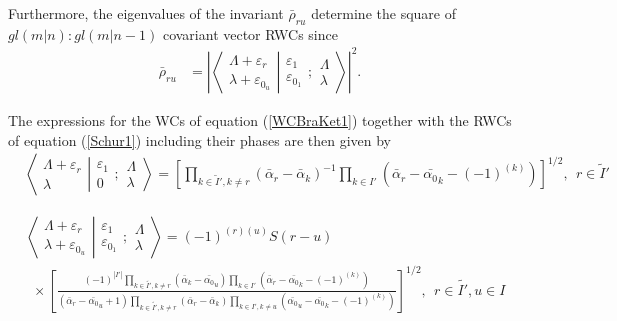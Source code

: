 \documentclass[12pt]{article}
\def\nn{\nonumber}
\begin{document}
Furthermore, the eigenvalues of the invariant $\bar{\rho}_{ru}$ determine the square of $gl(m|n):gl(m|n-1)$ covariant vector RWCs \cite{GIW2} since 
\begin{align}
\bar{\rho}_{ru}  &= \left| \left\langle\left. 
\begin{array}{c} \Lambda+\varepsilon_r\\ \lambda+\varepsilon_{0_u} \end{array}
\right|\right.
\left.
\begin{array}{c} \varepsilon_1 \\
\varepsilon_{0_1} \end{array} 
;
 \begin{array}{c} \Lambda \\
\lambda \end{array}
\right\rangle \right|^2.
\end{align}

The expressions for the WCs of equation (\ref{WCBraKet1}) together with the RWCs of equation (\ref{Schur1}) including their phases \cite{GIW2} are then given by
\begin{align}
& \left\langle\left. 
\begin{array}{c} \Lambda+\varepsilon_r\\ \lambda
 \end{array}
\right|\right.
\left.
\begin{array}{c} \varepsilon_1 \\ 0 
 \end{array}
; \begin{array}{c} \Lambda \\ \lambda
 \end{array}
\right\rangle = \left[ \prod_{k\in \tilde{I}',k\neq r} \left(\bar{\alpha}_r - \bar{\alpha}_k\right)^{-1}\prod_{k\in
I'} \left(\bar{\alpha}_r - \bar{\alpha_0}_k - (-1)^{(k)}\right) \right]^{1/2}
,\ \ r\in \tilde{I}'
\end{align}

\begin{align}
& \left\langle\left. 
\begin{array}{c} \Lambda+\varepsilon_r\\ \lambda+\varepsilon_{0_u} 
 \end{array}
\right|\right.
\left.
\begin{array}{c} \varepsilon_1 \\ \varepsilon_{0_1} 
 \end{array}
; \begin{array}{c} \Lambda \\ \lambda
 \end{array}
\right\rangle = (-1)^{(r)(u)} S(r-u) \nn\\
&~~\times 
\left[ 
\frac{
(-1)^{|I'|} \prod_{k\in\tilde{I'},k \neq r} \left(\bar{\alpha}_k - \bar{\alpha_0}_u \right)
\prod_{k\in I'} \left(\bar{\alpha}_r - \bar{\alpha_0}_k - (-1)^{(k)}\right) 
}
{
(\bar{\alpha}_r-\bar{\alpha_0}_u + 1)
\prod_{k\in \tilde{I'},k\neq r} \left(\bar{\alpha}_r - \bar{\alpha}_k \right)
\prod_{k\in I',k\neq u} \left(\bar{\alpha_0}_u - \bar{\alpha_0}_k - (-1)^{(k)}\right)
}
\right]^{1/2}
, \ \ r\in \tilde{I'},u\in I   \label{FinalBarredEven}
\end{align}
\end{document}
